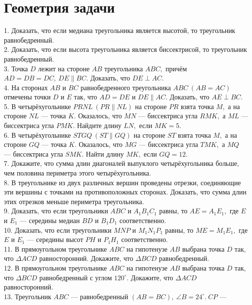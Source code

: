 \documentclass[12pt]{article}
\begin{document}
\section{Геометрия задачи}
1. Доказать, что если медиана треугольника является высотой, то треугольник равнобедренный.\\
2. Доказать, что если высота треугольника является биссектрисой, то треугольник равнобедренный.\\
3. Точка $D$ лежит на стороне $AB$ треугольника $ABC,$ причём $AD=DB=DC,\ DE\parallel BC.$ Доказать, что $DE\perp AC.$\\
4. На сторонах $AB$ и $BC$ равнобедренного треугольника $ABC\ (AB=AC)$ отмечены точки $D$ и $E$ так, что $AD=DE$ и $DE\parallel AC.$ Доказать, что $AE\perp BC.$\\
5. В четырёхугольнике $PRNL\ (PR\parallel NL)$ на стороне $PR$ взята точка $M,$ а на стороне $NL$ --- точка $K.$ Оказалось, что $MN$ --- биссектриса угла $RMK,$ а $ML$ --- биссектриса угла $PMK.$ Найдите длину $LN,$ если $MK=5.$\\
6. В четырёхугольнике $STGQ\ (ST\parallel GQ)$ на стороне $ST$ взята точка $M,$ а на стороне $GQ$ --- точка $K.$ Оказалось, что $MG$ --- биссектриса угла $TMK,$ а $MQ$ --- биссектриса угла $SMK.$ Найти длину $MK,$ если $GQ=12.$\\
7. Докажите, что сумма длин диагоналей выпуклого четырёхугольника больше, чем половина периметра этого четырёхугольника.\\
8. В треугольнике из двух различных вершин проведены отрезки, соединяющие эти вершины с точками на противоположных сторонах. Доказать, что сумма длин этих отрезков меньше периметра треугольника.\\
9. Доказать, что если треугольники $ABC$ и $A_1B_1C_1$ равны, то $AE=A_1E_1,$ где $E$ и $E_1$ --- середины медиан $BD$ и $B_1D_1$ соответственно.\\
10. Доказать, что если треугольники $MNP$ и $M_1N_1P_1$ равны, то $ME=M_1E_1,$ где $E$ и $E_1$ --- середины высот $PH$ и $P_1H_1$ соответственно.\\
11. В прямоугольном треугольнике $ABC$ на гипотенузе $AB$ выбрана точка $D$ так, что
$\Delta ACD$ равносторонний. Докажите, что $\Delta BCD$ равнобедренный.\\
12. В прямоугольном треугольнике $ABC$ на гипотенузе $AB$ выбрана точка $D$ так, что
$\Delta BCD$ равнобедренный с углом $120^\circ.$ Докажите, что $\Delta ACD$ равносторонний.\\
13. Треугольник $ABC$ --- равнобедренный $(AB=BC),\ \angle B=24^\circ.\ CP$ ---
\end{document}
